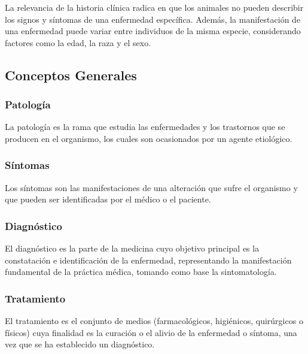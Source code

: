 			La relevancia de la historia clínica radica en que los animales no pueden describir los signos y síntomas de una enfermedad específica. Además, la manifestación de una enfermedad puede variar entre individuos de la misma especie, considerando factores como la edad, la raza y el sexo.  %

    \subsection{Conceptos Generales}

        \subsubsection{Patología}

            La patología es la rama que estudia las enfermedades y los trastornos que se producen en el organismo, los cuales son ocasionados por un agente etiológico.  %

        \subsubsection{Síntomas}

            Los síntomas son las manifestaciones de una alteración que sufre el organismo y que pueden ser identificadas por el médico o el paciente.  %

        \subsubsection{Diagnóstico}

            El diagnóstico es la parte de la medicina cuyo objetivo principal es la constatación e identificación de la enfermedad, representando la manifestación fundamental de la práctica médica, tomando como base la sintomatología.  %

        \subsubsection{Tratamiento}

            El tratamiento es el conjunto de medios (farmacológicos, higiénicos, quirúrgicos o físicos) cuya finalidad es la curación o el alivio de la enfermedad o síntoma, una vez que se ha establecido un diagnóstico.  %

